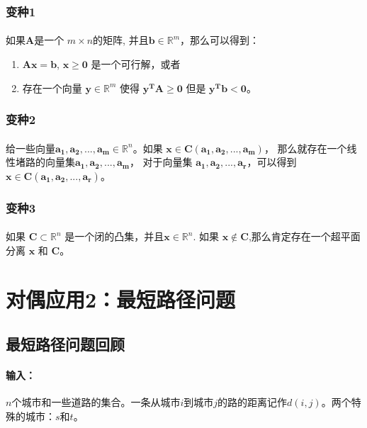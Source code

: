 				\subsubsection{变种1}
					\paragraph{}如果$\mathbf{A}$是一个 $m\times n$的矩阵, 并且$\mathbf{b} \in \mathbb{R}^{m}$，那么可以得到：
					\begin{enumerate}
						\item $\mathbf{A x = b}$, $\mathbf{x\geq 0}$ 是一个可行解，或者
						\item 存在一个向量 $\mathbf{y}\in \mathbb{R}^{m}$ 使得 $\mathbf{y^{T} A \geq 0}$ 但是 $\mathbf{y^{T} b  < 0}$。
					\end{enumerate}
				\subsubsection{变种2}
					\paragraph{}给一些向量$\mathbf{a_1, a_{2}, ..., a_{m}} \in \mathbb{R}^n$。如果 $\mathbf{x} \in \mathbf{C(a_{1}, a_{2},..., a_{m})}$， 那么就存在一个线性堵路的向量集$\mathbf{a_1, a_{2}, ..., a_{m}}$， 对于向量集 $\mathbf{a_1, a_{2}, ..., a_{r}}$，可以得到 $\mathbf{x} \in \mathbf{C(a_{1}, a_{2},..., a_{r})}$。
				\subsubsection{变种3}
					\paragraph{}如果 $\mathbf{C} \subset \mathbb{R}^n$ 是一个闭的凸集，并且$\mathbf{x} \in \mathbb{R}^n$. 如果 $\mathbf{x} \notin \mathbf{C}$,那么肯定存在一个超平面分离 $\mathbf{x}$ 和 $\mathbf{C}$。						
	\section{对偶应用2：最短路径问题}
		\subsection{最短路径问题回顾}
			\paragraph{输入：}$n$个城市和一些道路的集合。一条从城市$i$到城市$j$的路的距离记作$d(i,j)$。两个特殊的城市：$s$和$t$。
